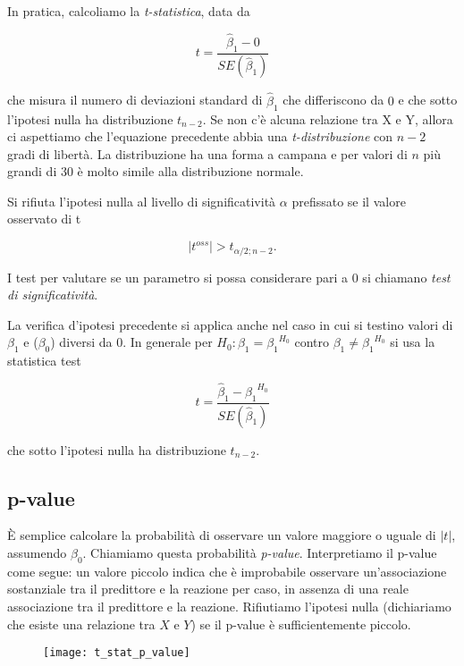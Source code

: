 In pratica, calcoliamo la \textit{t-statistica}, data da

\begin{equation}
t = \frac{{\hat{\beta}}_1 - 0}{SE({\hat{\beta}}_1)}
\end{equation}

che misura il numero di deviazioni standard di ${\hat{\beta}}_1$ che differiscono da $0$ e che sotto l'ipotesi nulla ha distribuzione $t_{n-2}$. Se non c'è alcuna relazione tra X e Y, allora ci aspettiamo che l'equazione precedente abbia una \textit{t-distribuzione} con $n - 2$ gradi di libertà. La distribuzione ha una forma a campana e per valori di $n$ più grandi di 30 è molto simile alla distribuzione normale.

Si rifiuta l'ipotesi nulla al livello di significatività $\alpha$ prefissato se il valore osservato di t

\begin{equation}
|t^{oss}| > t_{{\alpha}/2;n-2}.
\end{equation}

I test per valutare se un parametro si possa considerare pari a 0 si chiamano \textit{test di significatività}.

La verifica d'ipotesi precedente si applica anche nel caso in cui si testino valori di ${\beta}_1$ e (${\beta}_0$) diversi da 0. In generale per $H_0: {\beta}_1 = {{\beta}_1}^{H_0}$ contro ${\beta}_1 \neq {{\beta}_1}^{H_0}$ si usa la statistica test

\begin{equation}
t = \frac{{\hat{\beta}}_1 - {{\beta}_1}^{H_0}}{SE({\hat{\beta}}_1)}
\end{equation}

che sotto l'ipotesi nulla ha distribuzione $t_{n-2}$.

\subsection{p-value}

È semplice calcolare la probabilità di osservare un valore maggiore o uguale di $|t|$, assumendo ${\beta}_0$. Chiamiamo questa probabilità \textit{p-value}. Interpretiamo il p-value come segue: un valore piccolo indica che è improbabile osservare un'associazione sostanziale tra il predittore e la reazione per caso, in assenza di una reale associazione tra il predittore e la reazione. Rifiutiamo l'ipotesi nulla (dichiariamo che esiste una relazione tra $X$ e $Y$) se il p-value è sufficientemente piccolo.

\begin{figure}[H]
\centering
\texttt{[image: t\_stat\_p\_value]}
\end{figure}